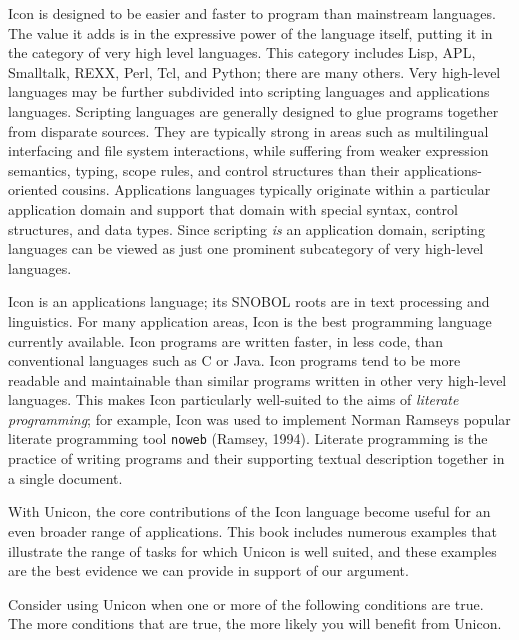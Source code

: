 Icon is designed to be easier and faster to program than mainstream
languages. The value it adds is in the expressive power of the language
itself, putting it in the category of {\textquotedbl}very high level
languages.{\textquotedbl} This category includes Lisp,
APL, Smalltalk, REXX,
Perl, Tcl, and Python; there are
many others. Very high-level languages may be further subdivided into
scripting languages and applications
languages. Scripting languages are generally designed to glue programs
together from disparate sources. They are typically strong in areas
such as multilingual interfacing and file system interactions, while
suffering from weaker expression semantics, typing, scope rules, and
control structures than their applications-oriented cousins.
Applications languages typically originate within a particular
application domain and support that domain with special syntax, control
structures, and data types. Since scripting \textit{is} an application
domain, scripting languages can be viewed as just one prominent
subcategory of very high-level languages.

Icon is an applications language; its SNOBOL roots are in text
processing and linguistics. For many application areas, Icon is the
best programming language currently available. Icon programs are
written faster, in less code, than conventional languages such as C or
Java. Icon programs tend to be more readable and maintainable than
similar programs written in other very high-level languages. This makes
Icon particularly well-suited to the aims of \textit{literate programming}; for example, Icon was used
to implement Norman Ramsey{\textquotesingle}s popular literate
programming tool \texttt{noweb} (Ramsey, 1994). Literate programming is
the practice of writing programs and their supporting textual
description together in a single document.

With Unicon, the core contributions of the Icon language become useful
for an even broader range of applications. This book includes numerous
examples that illustrate the range of tasks for which Unicon is well
suited, and these examples are the best evidence we can provide in
support of our argument.

Consider using Unicon when one or more of the following conditions are
true. The more conditions that are true, the more likely you will
benefit from Unicon.

